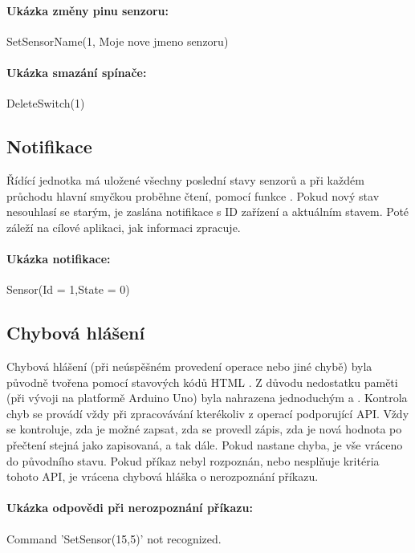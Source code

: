 \documentclass[FM,DP]{tulthesis}  %
\begin{document}
\paragraph{Ukázka změny pinu senzoru:}
\begin{center}
SetSensorName(1, Moje nove jmeno senzoru)
\end{center}

\paragraph{Ukázka smazání spínače:}
\begin{center}
DeleteSwitch(1)
\end{center}

\subsection{Notifikace}
Řídící jednotka má uložené všechny poslední stavy senzorů a při každém průchodu hlavní smyčkou proběhne čtení, pomocí funkce . Pokud nový stav nesouhlasí se starým, je zaslána notifikace s ID zařízení a aktuálním stavem. Poté záleží na cílové aplikaci, jak informaci zpracuje.

\paragraph{Ukázka notifikace:}
\begin{center}
Sensor(Id = 1,State = 0)
\end{center} 

\subsection{Chybová hlášení}
Chybová hlášení (při neúspěšném provedení operace nebo jiné chybě) byla původně tvořena pomocí stavových kódů HTML \cite{HTML1.1}. Z důvodu nedostatku paměti (při vývoji na platformě Arduino Uno) byla nahrazena jednoduchým  a . Kontrola chyb se provádí vždy při zpracovávání kterékoliv z operací podporující API. Vždy se kontroluje, zda je možné zapsat, zda se provedl zápis, zda je nová hodnota po přečtení stejná jako zapisovaná, a tak dále. Pokud nastane chyba, je vše vráceno do původního stavu. Pokud příkaz nebyl rozpoznán, nebo nesplňuje kritéria tohoto API, je vrácena chybová hláška o nerozpoznání příkazu.
\paragraph{Ukázka odpovědi při nerozpoznání příkazu:}
\begin{center}
Command 'SetSensor(15,5)' not recognized.
\end{center} 
\end{document}
